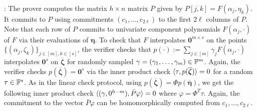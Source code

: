 : The prover computes the matrix
$h\times n$ matrix $P$ given by $P[j,k]=F(\alpha_j,\eta_k)$. It commits to $P$
using commitments $(c_1,\ldots,c_{2\ell})$ to the first $2\ell$ columns of $P$.
Note that each row of $P$ commits to univariate component polynomials
$F(\alpha_j,\cdot)$ of $F$ via their evaluations of $\bm{\eta}$. To check that
$F$ interpolates $\bm{0}^{m\times s}$ on the points
$\{(\alpha_j,\zeta_k)\}_{j\in [m],k\in [s]}$, the verifier checks that
$p(\cdot) := \sum_{j\in [m]}\gamma_jF(\alpha_j,\cdot)$ interpolates $\bm{0}^s$ on
$\overline{\bm{\zeta}}$ for randomly sampled $\gamma=(\gamma_1,\ldots,\gamma_m)\in \mathbb{F}^m$.
Again, the verifier checks $p(\overline{\bm{\zeta}})=\bm{0}^s$ via the inner product
check $\langle \tau,p(\overline{\bm{\zeta}})\rangle=0$ for a random $\tau\in \mathbb{F}^s$. As in the
linear check protocol, using $p(\overline{\bm{\zeta}})=\Phi p(\overline{\bm{\eta}})$, we
get the following inner product check
$\langle (\gamma,0^{h-m}),\bar{P}\varphi\rangle=0$ where $\varphi=\Phi^T\tau$. Again,
the commitment to the vector $\bar{P}\varphi$ can be homomorphically computed
from $c_1,\ldots,c_{2\ell}$. \smallskip

